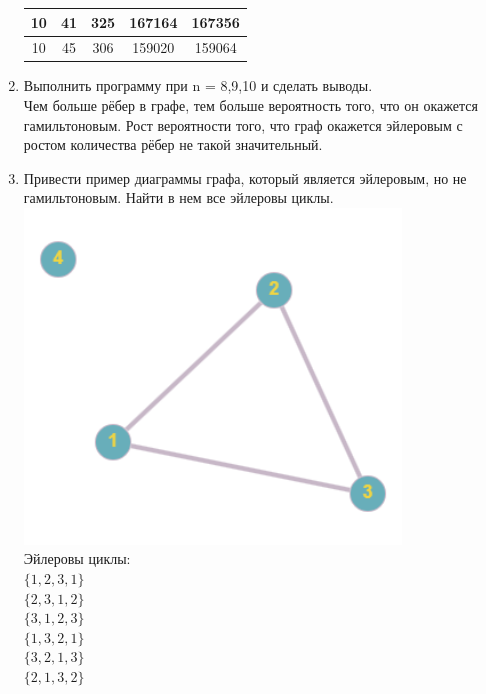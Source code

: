 \documentclass[a4paper,14pt]{extarticle}
\begin{document}
\begin{enumerate}[1.]
\begin{tabular}{|c|c|c|c|c|}
              \hline
              10                                 & 41                                & 325                                     & 167164        & 167356 \\
              \hline
              10                                 & 45                                & 306                                     & 159020        & 159064 \\
              \hline
          \end{tabular}

    \item Выполнить программу при n = 8,9,10 и сделать выводы.\\
          Чем больше рёбер в графе, тем больше вероятность того, что он окажется
          гамильтоновым.
          Рост вероятности того, что граф окажется эйлеровым с ростом количества рёбер не такой значительный.
    \item Привести пример диаграммы графа, который является эйлеровым,
          но не гамильтоновым. Найти в нем все эйлеровы циклы.\\
          \includegraphics[width=100mm]{4}\\
          Эйлеровы циклы:\\
          $\{1, 2, 3, 1\}$\\
          $\{2, 3, 1, 2\}$\\
          $\{3, 1, 2, 3\}$\\
          $\{1, 3, 2, 1\}$\\
          $\{3, 2, 1, 3\}$\\
          $\{2, 1, 3, 2\}$


\end{enumerate}
\end{document}
